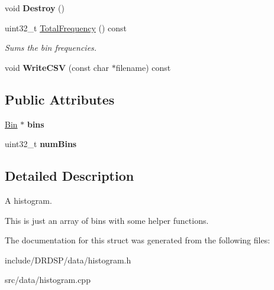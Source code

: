 \begin{DoxyCompactItemize}
\item 
\hypertarget{struct_d_r_d_s_p_1_1_histogram_a84577ee394d1017b16aa4229ff7f5904}{void {\bfseries Destroy} ()}\label{struct_d_r_d_s_p_1_1_histogram_a84577ee394d1017b16aa4229ff7f5904}

\item 
\hypertarget{struct_d_r_d_s_p_1_1_histogram_adeb7a588aa66fe2e6dd0d851ea92d625}{uint32\-\_\-t \hyperlink{struct_d_r_d_s_p_1_1_histogram_adeb7a588aa66fe2e6dd0d851ea92d625}{Total\-Frequency} () const }\label{struct_d_r_d_s_p_1_1_histogram_adeb7a588aa66fe2e6dd0d851ea92d625}

\begin{DoxyCompactList}\small\item\em Sums the bin frequencies. \end{DoxyCompactList}\item 
\hypertarget{struct_d_r_d_s_p_1_1_histogram_a849de9ad07ff6c468dad15a9951a3f81}{void {\bfseries Write\-C\-S\-V} (const char $\ast$filename) const }\label{struct_d_r_d_s_p_1_1_histogram_a849de9ad07ff6c468dad15a9951a3f81}

\end{DoxyCompactItemize}
\subsection*{Public Attributes}
\begin{DoxyCompactItemize}
\item 
\hypertarget{struct_d_r_d_s_p_1_1_histogram_a22b2c10bc25d799a1d32dec46887dcb0}{\hyperlink{struct_d_r_d_s_p_1_1_bin}{Bin} $\ast$ {\bfseries bins}}\label{struct_d_r_d_s_p_1_1_histogram_a22b2c10bc25d799a1d32dec46887dcb0}

\item 
\hypertarget{struct_d_r_d_s_p_1_1_histogram_a0958a362ffa72e63c899f6622c2aa638}{uint32\-\_\-t {\bfseries num\-Bins}}\label{struct_d_r_d_s_p_1_1_histogram_a0958a362ffa72e63c899f6622c2aa638}

\end{DoxyCompactItemize}


\subsection{Detailed Description}
A histogram. 

This is just an array of bins with some helper functions. 

The documentation for this struct was generated from the following files\-:\begin{DoxyCompactItemize}
\item 
include/\-D\-R\-D\-S\-P/data/histogram.\-h\item 
src/data/histogram.\-cpp\end{DoxyCompactItemize}
